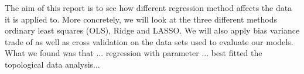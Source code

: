 \thispagestyle{plain}

\noindent The aim of this report is to see how different regression method affects the data it is applied to. 
More concretely, we will look at the three different methods ordinary least squares (OLS), Ridge and LASSO. 
We will also apply bias variance trade of as well as cross validation on the data sets used to evaluate our models.
What we found was that ... regression with parameter ... best fitted the topological data analysis...
